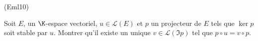 \begin{tiny}(Eml10)\end{tiny} Soit $E$, un $\K$-espace vectoriel, $u\in \mathcal{L}(E)$ et $p$ un projecteur de $E$ tels que $\ker p$ soit stable par $u$. Montrer qu'il existe un unique $v\in \mathcal{L}(\Im p)$ tel que $p\circ u = v \circ p$. 